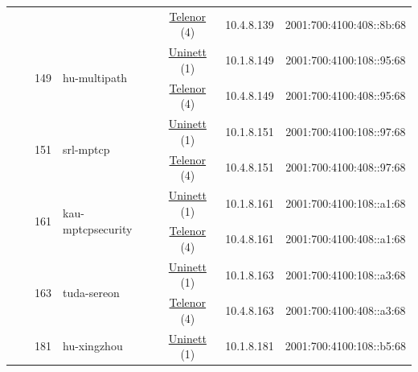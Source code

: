 \begin{small}
\begin{center}
\begin{longtable}{|c|c|c|c|c|c|c|c|}
  &  &  &  & \multicolumn{2}{|c|}{\tiny{\href{https://www.telenor.no}{Telenor} (4)}} & \tiny{10.4.8.139} & \tiny{2001:700:4100:408::8b:68} \\* \cline{3-3}\cline{4-4}\cline{5-5}\cline{6-6}\cline{7-7}\cline{8-8}
  &  & \multirow{2}{*}{\tiny{149}} & \multicolumn{1}{|l|}{\multirow{2}{*}{\tiny{hu-multipath}}} & \multicolumn{2}{|c|}{\tiny{\href{https://www.uninett.no}{Uninett} (1)}} & \tiny{10.1.8.149} & \tiny{2001:700:4100:108::95:68} \\* \cline{5-5}\cline{6-6}\cline{7-7}\cline{8-8}
  &  &  &  & \multicolumn{2}{|c|}{\tiny{\href{https://www.telenor.no}{Telenor} (4)}} & \tiny{10.4.8.149} & \tiny{2001:700:4100:408::95:68} \\* \cline{3-3}\cline{4-4}\cline{5-5}\cline{6-6}\cline{7-7}\cline{8-8}
  &  & \multirow{2}{*}{\tiny{151}} & \multicolumn{1}{|l|}{\multirow{2}{*}{\tiny{srl-mptcp}}} & \multicolumn{2}{|c|}{\tiny{\href{https://www.uninett.no}{Uninett} (1)}} & \tiny{10.1.8.151} & \tiny{2001:700:4100:108::97:68} \\* \cline{5-5}\cline{6-6}\cline{7-7}\cline{8-8}
  &  &  &  & \multicolumn{2}{|c|}{\tiny{\href{https://www.telenor.no}{Telenor} (4)}} & \tiny{10.4.8.151} & \tiny{2001:700:4100:408::97:68} \\* \cline{3-3}\cline{4-4}\cline{5-5}\cline{6-6}\cline{7-7}\cline{8-8}
  &  & \multirow{2}{*}{\tiny{161}} & \multicolumn{1}{|l|}{\multirow{2}{*}{\tiny{kau-mptcpsecurity}}} & \multicolumn{2}{|c|}{\tiny{\href{https://www.uninett.no}{Uninett} (1)}} & \tiny{10.1.8.161} & \tiny{2001:700:4100:108::a1:68} \\* \cline{5-5}\cline{6-6}\cline{7-7}\cline{8-8}
  &  &  &  & \multicolumn{2}{|c|}{\tiny{\href{https://www.telenor.no}{Telenor} (4)}} & \tiny{10.4.8.161} & \tiny{2001:700:4100:408::a1:68} \\* \cline{3-3}\cline{4-4}\cline{5-5}\cline{6-6}\cline{7-7}\cline{8-8}
  &  & \multirow{2}{*}{\tiny{163}} & \multicolumn{1}{|l|}{\multirow{2}{*}{\tiny{tuda-sereon}}} & \multicolumn{2}{|c|}{\tiny{\href{https://www.uninett.no}{Uninett} (1)}} & \tiny{10.1.8.163} & \tiny{2001:700:4100:108::a3:68} \\* \cline{5-5}\cline{6-6}\cline{7-7}\cline{8-8}
  &  &  &  & \multicolumn{2}{|c|}{\tiny{\href{https://www.telenor.no}{Telenor} (4)}} & \tiny{10.4.8.163} & \tiny{2001:700:4100:408::a3:68} \\* \cline{3-3}\cline{4-4}\cline{5-5}\cline{6-6}\cline{7-7}\cline{8-8}
  &  & \multirow{2}{*}{\tiny{181}} & \multicolumn{1}{|l|}{\multirow{2}{*}{\tiny{hu-xingzhou}}} & \multicolumn{2}{|c|}{\tiny{\href{https://www.uninett.no}{Uninett} (1)}} & \tiny{10.1.8.181} & \tiny{2001:700:4100:108::b5:68} \\* \cline{5-5}\cline{6-6}\cline{7-7}\cline{8-8}

\end{longtable}
\end{center}
\end{small}
